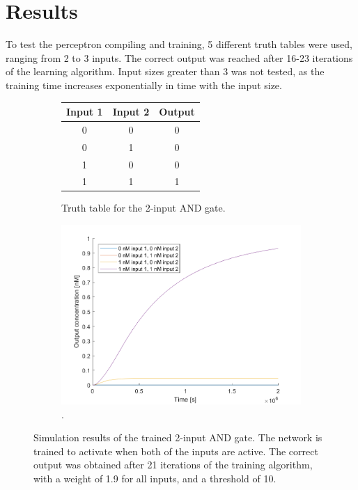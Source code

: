 
\section{Results}
To test the perceptron compiling and training, 5 different truth tables were used, ranging from 2 to 3 inputs. The correct output was reached after 16-23 iterations of the learning algorithm. Input sizes greater than 3 was not tested, as the training time increases exponentially in time with the input size.


\begin{figure}[H]
  \begin{subfigure}[t]{.49\columnwidth}
    \begin{tabular}[b]{ccc}
      \hline
    \multicolumn{1}{l}{\textbf{Input 1}} & \multicolumn{1}{l}{\textbf{Input 2}} & \multicolumn{1}{l}{\textbf{Output}} \\
    \hline
    0                                    & 0                                    & 0                                   \\
    0                                    & 1                                    & 0                                   \\
    1                                    & 0                                    & 0                                   \\
    1                                    & 1                                    & 1 \\
    \hline
    \end{tabular}
    \caption{Truth table for the 2-input AND gate.}
    \label{and_table}
\end{subfigure}
\hfill
\begin{subfigure}[t]{.49\columnwidth}
  \centering
\includegraphics[width=\linewidth]{images/and_simulation.png}
\caption{.}
\label{}
\end{subfigure}
\caption{Simulation results of the trained 2-input AND gate. The network is trained to activate when both of the inputs are active. The correct output was obtained after 21 iterations of the training algorithm, with a weight of 1.9 for all inputs, and a threshold of 10.}
\end{figure}


